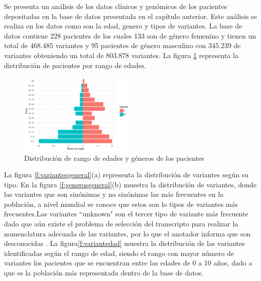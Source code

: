 Se presenta un análisis de los datos clínicos  y genómicos de los pacientes depositadas en la base de datos presentada en el capítulo anterior. Este análisis se realiza en los datos como son la edad, genero y tipos de variantes. La base de datos contiene 228 pacientes de los cuales 133 son de género femenino y tienen un total de 468.485 variantes y 95 pacientes de género masculino con 345.239 de variantes obteniendo  un total de 803.878 variantes. La  figura \ref{fig:general} representa la distribución de pacientes por rango de edades.\\

\begin{figure}[h!]
	\centering
	\includegraphics[width=0.5\textwidth]{Kap4/general}
	\caption{Distribución de rango de edades y géneros de los pacientes}
	\label{fig:general}
\end{figure}

La figura \ref{f:variantesgeneral}(a) representa la distribución de variantes según su tipo. En la figura \ref{f:generosgeneral}(b) muestra la distribución  de variantes, donde las variantes que son sinónimas y no sinónimas las más frecuentes en la población, a  nivel mundial se conoce que estos son lo tipos de variantes más frecuentes\cite{Fu2013}.Las variantes ``unknown"  son el tercer tipo de variante más frecuente dado que aún existe el problema de selección del transcripto para realizar la nomenclatura adecuada de las variantes, por lo que el anotador informa que son desconocidas \cite{McCarthy2014}. La figura\ref{f:variantedad} muestra la distribución de las variantes identificadas según el rango de edad, siendo el rango con mayor número de variantes los pacientes que se encuentran entre las edades de 0 a 10 años, dado a que es la población más representada dentro de la base de datos. \\

